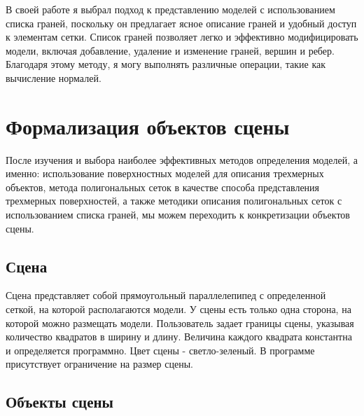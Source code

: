 В своей работе я выбрал подход к представлению моделей с использованием списка граней, поскольку он предлагает ясное описание граней и удобный доступ к элементам сетки. Список граней позволяет легко и эффективно модифицировать модели, включая добавление, удаление и изменение граней, вершин и ребер. Благодаря этому методу, я могу выполнять различные операции, такие как вычисление нормалей.




\section{Формализация объектов сцены}
 
После изучения и выбора наиболее эффективных методов определения моделей, а именно: использование поверхностных моделей для описания трехмерных объектов, метода полигональных сеток в качестве способа представления трехмерных поверхностей, а также методики описания полигональных сеток с использованием списка граней, мы можем переходить к конкретизации объектов сцены.

\subsection{Сцена}
Сцена представляет собой прямоугольный параллелепипед с определенной сеткой, на которой располагаются модели. У сцены есть только одна сторона, на которой можно размещать модели. Пользователь задает границы сцены, указывая количество квадратов в ширину и длину. Величина каждого квадрата константна и определяется программно. Цвет сцены - светло-зеленый. В программе присутствует ограничение на размер сцены.


\subsection{Объекты сцены}

